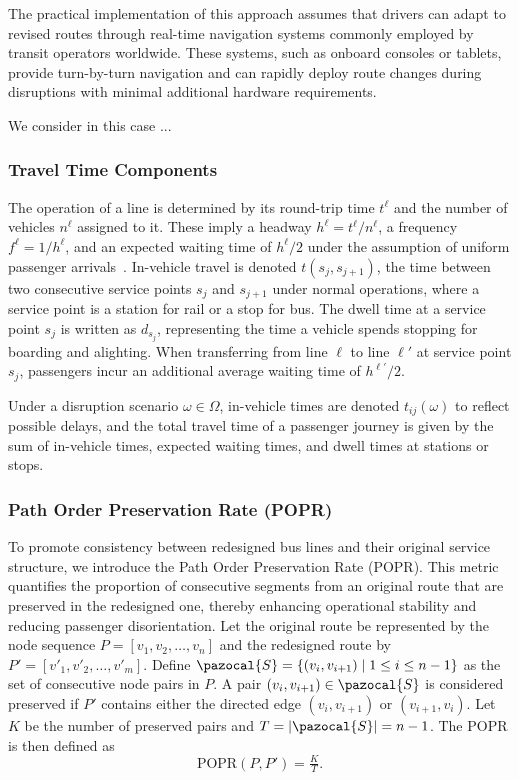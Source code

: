 \documentclass[3p,times,procedia]{elsarticle}
\begin{document}
The practical implementation of this approach assumes that drivers can adapt to revised routes through real-time navigation systems commonly employed by transit operators worldwide. These systems, such as onboard consoles or tablets, provide turn-by-turn navigation and can rapidly deploy route changes during disruptions with minimal additional hardware requirements.

We consider in this case ...

\subsubsection{Travel Time Components}
The operation of a line is determined by its round-trip time $t^\ell$ and the number of vehicles $n^\ell$ assigned to it. These imply a headway $h^\ell = t^\ell/n^\ell$, a frequency $f^\ell = 1/h^\ell$, and an expected waiting time of $h^\ell/2$ under the assumption of uniform passenger arrivals~\citep{pinto2020joint}. In-vehicle travel is denoted $t(s_j, s_{j+1})$, the time between two consecutive service points $s_j$ and $s_{j+1}$ under normal operations, where a service point is a station for rail or a stop for bus. The dwell time at a service point $s_j$ is written as $d_{s_j}$, representing the time a vehicle spends stopping for boarding and alighting. When transferring from line $\ell$ to line $\ell'$ at service point $s_j$, passengers incur an additional average waiting time of $h^{\ell'}/2$.  

Under a disruption scenario $\omega \in \Omega$, in-vehicle times are denoted $t_{ij}(\omega)$ to reflect possible delays, and the total travel time of a passenger journey is given by the sum of in-vehicle times, expected waiting times, and dwell times at stations or stops.

\subsubsection{Path Order Preservation Rate (POPR)}
To promote consistency between redesigned bus lines and their original service structure, we introduce the Path Order Preservation Rate (POPR). This metric quantifies the proportion of consecutive segments from an original route that are preserved in the redesigned one, thereby enhancing operational stability and reducing passenger disorientation.
%
Let the original route be represented by the node sequence $P = [v_1, v_2, \dots, v_n]$ and the redesigned route by $P' = [v'_1, v'_2, \dots, v'_m]$. Define $\pazocal{S} = \{(v_i, v_{i+1}) \mid 1 \leq i \leq n-1\}$ as the set of consecutive node pairs in $P$. A pair $(v_i, v_{i+1}) \in \pazocal{S}$ is considered preserved if $P'$ contains either the directed edge $(v_i,v_{i+1})$ or $(v_{i+1},v_i)$. Let $K$ be the number of preserved pairs and $T = |\pazocal{S}| = n-1$. The POPR is then defined as
\begin{equation}
    \text{POPR}(P,P') = \tfrac{K}{T}.
\end{equation}
\end{document}
